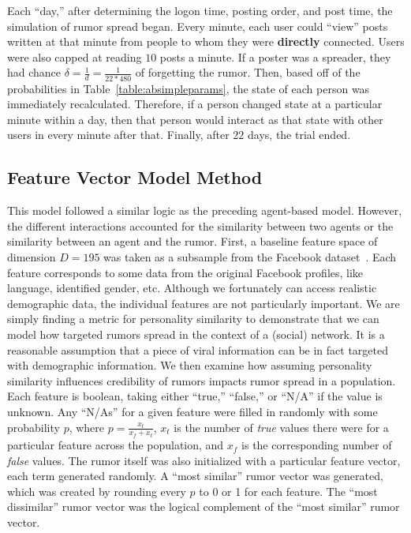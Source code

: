Each ``day,'' after determining the logon time, posting order, and post time, the simulation of rumor spread began.
Every minute, each user could ``view'' posts written at that minute from people to whom they were \textbf{directly} connected.
Users were also capped at reading $ 10 $ posts a minute.
If a poster was a spreader, they had chance $ \delta = \frac{1}{d} = \frac{1}{22*480} $ of forgetting the rumor.
Then, based off of the probabilities in Table~\ref{table:absimpleparams}, the state of each person was immediately recalculated.
Therefore, if a person changed state at a particular minute within a day, then that person would interact as that state with other users in every minute after that.
Finally, after $ 22 $ days, the trial ended.

\subsection{Feature Vector Model Method}
\label{subsec:fvmodelsetup}

This model followed a similar logic as the preceding agent-based model.
However, the different interactions accounted for the similarity between two agents or the similarity between an agent and the rumor.
First, a baseline feature space of dimension $ D = 195 $ was taken as a subsample from the Facebook dataset~\cite{mcauley-2014}.
Each feature corresponds to some data from the original Facebook profiles, like language, identified gender, etc.
Although we fortunately can access realistic demographic data, the individual features are not particularly important.
We are simply finding a metric for personality similarity to demonstrate that we can model how targeted rumors spread in the context of a (social) network.
It is a reasonable assumption that a piece of viral information can be in fact targeted with demographic information.
We then examine how assuming personality similarity influences credibility of rumors impacts rumor spread in a population.
Each feature is boolean, taking either ``true,'' ``false,'' or ``N/A'' if the value is unknown.
Any ``N/As'' for a given feature were filled in randomly with some probability $ p $, where $ p = \frac{x_{t}}{x_{f} + x_{t}} $, $ x_{t} $ is the number of \textit{true} values there were for a particular feature across the population, and $ x_{f} $ is the corresponding number of \textit{false} values.
The rumor itself was also initialized with a particular feature vector, each term generated randomly.
A ``most similar'' rumor vector was generated, which was created by rounding every $ p $ to 0 or 1 for each feature.
The ``most dissimilar'' rumor vector was the logical complement of the ``most similar'' rumor vector.

